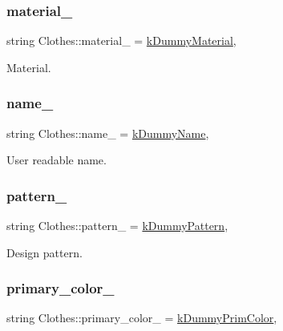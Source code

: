 \subsubsection{\texorpdfstring{material\+\_\+}{material\_}}
{\footnotesize\ttfamily string Clothes\+::material\+\_\+ = \mbox{\hyperlink{clothes_8h_a9df1268c6668ae4e2a728ccf032cc33d}{k\+Dummy\+Material}}\hspace{0.3cm}{\ttfamily [protected]}, {\ttfamily [inherited]}}



Material. 

\mbox{\label{classClothes_a7f2275aaae24224d60c48af922c31b65}} 
\subsubsection{\texorpdfstring{name\+\_\+}{name\_}}
{\footnotesize\ttfamily string Clothes\+::name\+\_\+ = \mbox{\hyperlink{clothes_8h_adba739b5125fd5a4066ec0ef063c0657}{k\+Dummy\+Name}}\hspace{0.3cm}{\ttfamily [protected]}, {\ttfamily [inherited]}}



User readable name. 

\mbox{\label{classClothes_a1d40145a4eb6d28441f112f030ab5d35}} 
\subsubsection{\texorpdfstring{pattern\+\_\+}{pattern\_}}
{\footnotesize\ttfamily string Clothes\+::pattern\+\_\+ = \mbox{\hyperlink{clothes_8h_a2e72ae4d77adb7bc9cbecf4dea1e9e22}{k\+Dummy\+Pattern}}\hspace{0.3cm}{\ttfamily [protected]}, {\ttfamily [inherited]}}



Design pattern. 

\mbox{\label{classClothes_a7cb005bf6cbb7f4eaa40f1b31817559c}} 
\subsubsection{\texorpdfstring{primary\+\_\+color\+\_\+}{primary\_color\_}}
{\footnotesize\ttfamily string Clothes\+::primary\+\_\+color\+\_\+ = \mbox{\hyperlink{clothes_8h_a1b9c685d3bf2811d95b65e0d396c1344}{k\+Dummy\+Prim\+Color}}\hspace{0.3cm}{\ttfamily [protected]}, {\ttfamily [inherited]}}



